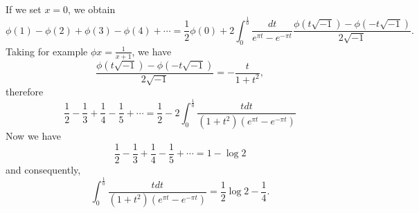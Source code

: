 \documentclass[12pt]{article}
\begin{document}
If we set $x = 0$, we obtain 
\[ \phi(1) - \phi(2) + \phi(3) -\phi(4) + \cdots  = \frac{1}{2} \phi(0) + 2 \int_0^{\frac{1}{0}} \frac{dt}{e^{\pi t} - e^{-\pi t}} \frac{\phi(t \sqrt{-1}) - \phi(-t \sqrt{-1})}{2 \sqrt{-1}} .\]
Taking for example $\phi x = \frac{1}{x+1}$, we have 
\[ \frac{\phi(t \sqrt{-1}) - \phi(-t\sqrt{-1})}{2 \sqrt{-1}} = - \frac{t}{1+t^2} , \]
therefore
\[ \frac{1}{2} - \frac{1}{3} + \frac{1}{4} - \frac{1}{5} + \cdots  = \frac{1}{2} - 2 \int_0^{\frac{1}{0}} \frac{t dt}{(1+t^2)(e^{\pi t} - e^{-\pi t} )} \]
Now we have 
\[ \frac{1}{2} - \frac{1}{3} + \frac{1}{4} - \frac{1}{5} + \cdots = 1  - \log 2 \]
and consequently, 
\[ \int_0^{\frac{1}{0}} \frac{t dt}{(1+t^2)(e^{\pi t} - e^{-\pi t} )}= \frac{1}{2} \log 2 - \frac{1}{4} .\] 



  
\end{document}
